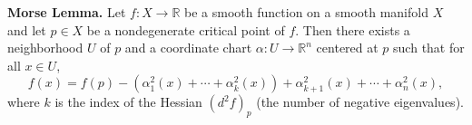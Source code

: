 \textbf{Morse Lemma.} Let $f: X \to \mathbb{R}$ be a smooth function on a smooth manifold $X$ and let $p \in X$ be a nondegenerate critical point of $f$. Then there exists a neighborhood $U$ of $p$ and a coordinate chart $\alpha: U \to \mathbb{R}^n$ centered at $p$ such that for all $x \in U$,
$$f(x) = f(p) - (\alpha_1^2(x) + \cdots + \alpha_k^2(x)) + \alpha_{k+1}^2(x) + \cdots + \alpha_n^2(x),$$
where $k$ is the index of the Hessian $(d^2 f)_p$ (the number of negative eigenvalues).
